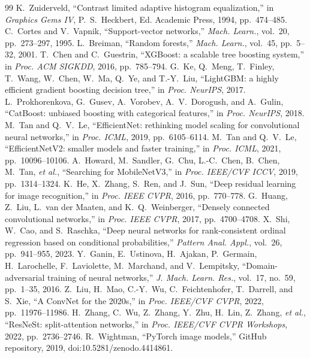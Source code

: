 \documentclass[journal]{IEEEtran}
\begin{document}
\begin{thebibliography}{99}
 K.~Zuiderveld, ``Contrast limited adaptive histogram equalization,'' in \emph{Graphics Gems IV}, P.~S.~Heckbert, Ed. Academic Press, 1994, pp.~474--485.
 C.~Cortes and V.~Vapnik, ``Support-vector networks,'' \emph{Mach. Learn.}, vol.~20, pp.~273--297, 1995.
 L.~Breiman, ``Random forests,'' \emph{Mach. Learn.}, vol.~45, pp.~5--32, 2001.
 T.~Chen and C.~Guestrin, ``XGBoost: a scalable tree boosting system,'' in \emph{Proc. ACM SIGKDD}, 2016, pp.~785--794.
 G.~Ke, Q.~Meng, T.~Finley, T.~Wang, W.~Chen, W.~Ma, Q.~Ye, and T.-Y.~Liu, ``LightGBM: a highly efficient gradient boosting decision tree,'' in \emph{Proc. NeurIPS}, 2017.
 L.~Prokhorenkova, G.~Gusev, A.~Vorobev, A.~V.~Dorogush, and A.~Gulin, ``CatBoost: unbiased boosting with categorical features,'' in \emph{Proc. NeurIPS}, 2018.
 M.~Tan and Q.~V.~Le, ``EfficientNet: rethinking model scaling for convolutional neural networks,'' in \emph{Proc. ICML}, 2019, pp.~6105--6114.
 M.~Tan and Q.~V.~Le, ``EfficientNetV2: smaller models and faster training,'' in \emph{Proc. ICML}, 2021, pp.~10096--10106.
 A.~Howard, M.~Sandler, G.~Chu, L.-C.~Chen, B.~Chen, M.~Tan, \emph{et al.}, ``Searching for MobileNetV3,'' in \emph{Proc. IEEE/CVF ICCV}, 2019, pp.~1314--1324.
 K.~He, X.~Zhang, S.~Ren, and J.~Sun, ``Deep residual learning for image recognition,'' in \emph{Proc. IEEE CVPR}, 2016, pp.~770--778.
 G.~Huang, Z.~Liu, L.~van der Maaten, and K.~Q.~Weinberger, ``Densely connected convolutional networks,'' in \emph{Proc. IEEE CVPR}, 2017, pp.~4700--4708.
 X.~Shi, W.~Cao, and S.~Raschka, ``Deep neural networks for rank-consistent ordinal regression based on conditional probabilities,'' \emph{Pattern Anal. Appl.}, vol.~26, pp.~941--955, 2023.
 Y.~Ganin, E.~Ustinova, H.~Ajakan, P.~Germain, H.~Larochelle, F.~Laviolette, M.~Marchand, and V.~Lempitsky, ``Domain-adversarial training of neural networks,'' \emph{J. Mach. Learn. Res.}, vol.~17, no.~59, pp.~1--35, 2016.
 Z.~Liu, H.~Mao, C.-Y.~Wu, C.~Feichtenhofer, T.~Darrell, and S.~Xie, ``A ConvNet for the 2020s,'' in \emph{Proc. IEEE/CVF CVPR}, 2022, pp.~11976--11986.
 H.~Zhang, C.~Wu, Z.~Zhang, Y.~Zhu, H.~Lin, Z.~Zhang, \emph{et al.}, ``ResNeSt: split-attention networks,'' in \emph{Proc. IEEE/CVF CVPR Workshops}, 2022, pp.~2736--2746.
 R.~Wightman, ``PyTorch image models,'' GitHub repository, 2019, doi:10.5281/zenodo.4414861.

\end{thebibliography}
\end{document}
